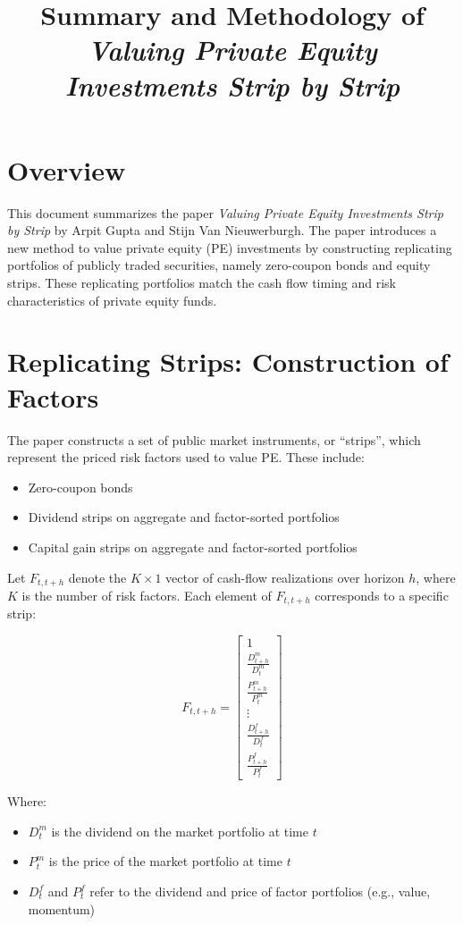 \documentclass[12pt]{article}
\title{Summary and Methodology of\\\textit{Valuing Private Equity Investments Strip by Strip}}
\author{}
\date{}
\begin{document}
\maketitle

\section{Overview}
This document summarizes the paper \textit{Valuing Private Equity Investments Strip by Strip} by Arpit Gupta and Stijn Van Nieuwerburgh. The paper introduces a new method to value private equity (PE) investments by constructing replicating portfolios of publicly traded securities, namely zero-coupon bonds and equity strips. These replicating portfolios match the cash flow timing and risk characteristics of private equity funds.

\section{Replicating Strips: Construction of Factors}
The paper constructs a set of public market instruments, or ``strips'', which represent the priced risk factors used to value PE. These include:

\begin{itemize}
    \item Zero-coupon bonds
    \item Dividend strips on aggregate and factor-sorted portfolios
    \item Capital gain strips on aggregate and factor-sorted portfolios
\end{itemize}

Let $F_{t,t+h}$ denote the $K \times 1$ vector of cash-flow realizations over horizon $h$, where $K$ is the number of risk factors. Each element of $F_{t,t+h}$ corresponds to a specific strip:

\begin{equation}
F_{t,t+h} = \begin{bmatrix}
1 \\
\frac{D^m_{t+h}}{D^m_t} \\
\frac{P^m_{t+h}}{P^m_t} \\
\vdots \\
\frac{D^f_{t+h}}{D^f_t} \\
\frac{P^f_{t+h}}{P^f_t}
\end{bmatrix}
\end{equation}

Where:
\begin{itemize}
    \item $D^m_{t}$ is the dividend on the market portfolio at time $t$
    \item $P^m_{t}$ is the price of the market portfolio at time $t$
    \item $D^f_{t}$ and $P^f_{t}$ refer to the dividend and price of factor portfolios (e.g., value, momentum)
\end{itemize}
\end{document}
